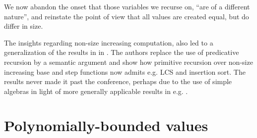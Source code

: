 We now abandon the onset that those variables we recurse on, ``are of a
different nature'', and reinstate the point of view that all values are created
equal, but do differ in size.

The insights regarding non-size increasing computation, also led to a
generalization of the results in \cite{marion-2003} in
\cite{marion-moyen-2000}. The authors replace the use of predicative recursion
by a semantic argument and show how primitive recursion over non-size
increasing base and step functions now admits e.g. LCS and insertion sort. The
results never made it past the conference, perhaps due to the use of simple
algebras in light of more generally applicable results in e.g.
\cite{aehlig-schwichtenberg-2002, hofmann-2003}.

\section{Polynomially-bounded values}
